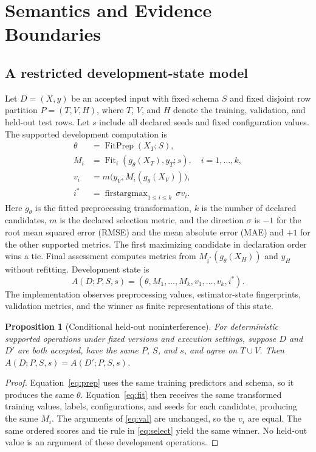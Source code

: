 \documentclass[lettersize,journal]{IEEEtran}
\newtheorem{proposition}{Proposition}
\begin{document}
\section{Semantics and Evidence Boundaries}\label{sec:semantics}
\subsection{A restricted development-state model}
Let $D=(X,y)$ be an accepted input with fixed schema $S$ and fixed disjoint row partition $P=(T,V,H)$, where $T$, $V$, and $H$ denote the training, validation, and held-out test rows. Let $s$ include all declared seeds and fixed configuration values. The supported development computation is
\begin{align}
 \theta &= \operatorname{FitPrep}(X_T;S), \label{eq:prep}\\
 M_i &= \operatorname{Fit}_i(g_\theta(X_T),y_T;s),\quad i=1,\ldots,k, \label{eq:fit}\\
 v_i &= m\bigl(y_V,M_i(g_\theta(X_V))\bigr), \label{eq:val}\\
 i^* &= \operatorname{firstargmax}_{1\le i\le k}\,\sigma v_i. \label{eq:select}
\end{align}
Here $g_\theta$ is the fitted preprocessing transformation, $k$ is the number of declared candidates, $m$ is the declared selection metric, and the direction $\sigma$ is $-1$ for the root mean squared error (RMSE) and the mean absolute error (MAE) and $+1$ for the other supported metrics. The first maximizing candidate in declaration order wins a tie. Final assessment computes metrics from $M_{i^*}(g_\theta(X_H))$ and $y_H$ without refitting. Development state is
\begin{equation}
 A(D;P,S,s)=(\theta,M_1,\ldots,M_k,v_1,\ldots,v_k,i^*). \label{eq:state}
\end{equation}
The implementation observes preprocessing values, estimator-state fingerprints, validation metrics, and the winner as finite representations of this state.

\begin{proposition}[Conditional held-out noninterference]\label{prop:noninterference}
For deterministic supported operations under fixed versions and execution settings, suppose $D$ and $D'$ are both accepted, have the same $P$, $S$, and $s$, and agree on $T\cup V$. Then $A(D;P,S,s)=A(D';P,S,s)$.
\end{proposition}
\begin{proof}
Equation~\eqref{eq:prep} uses the same training predictors and schema, so it produces the same $\theta$. Equation~\eqref{eq:fit} then receives the same transformed training values, labels, configurations, and seeds for each candidate, producing the same $M_i$. The arguments of \eqref{eq:val} are unchanged, so the $v_i$ are equal. The same ordered scores and tie rule in \eqref{eq:select} yield the same winner. No held-out value is an argument of these development operations.
\end{proof}
\end{document}
